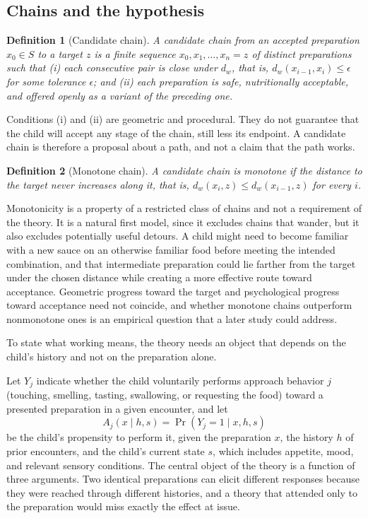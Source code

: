 \documentclass[11pt]{article}
\newtheorem{definition}{Definition}
\theoremstyle{remark}
\begin{document}
\subsection{Chains and the hypothesis}

\begin{definition}[Candidate chain]
A candidate chain from an accepted preparation $x_0 \in S$ to a target $z$ is a finite sequence $x_0, x_1, \ldots, x_n = z$ of distinct preparations such that (i) each consecutive pair is close under $d_w$, that is, $d_w(x_{i-1}, x_i) \leq \epsilon$ for some tolerance $\epsilon$; and (ii) each preparation is safe, nutritionally acceptable, and offered openly as a variant of the preceding one.
\end{definition}

Conditions (i) and (ii) are geometric and procedural. They do not guarantee that the child will accept any stage of the chain, still less its endpoint. A candidate chain is therefore a proposal about a path, and not a claim that the path works.

\begin{definition}[Monotone chain]
A candidate chain is monotone if the distance to the target never increases along it, that is, $d_w(x_i, z) \leq d_w(x_{i-1}, z)$ for every $i$.
\end{definition}

Monotonicity is a property of a restricted class of chains and not a requirement of the theory. It is a natural first model, since it excludes chains that wander, but it also excludes potentially useful detours. A child might need to become familiar with a new sauce on an otherwise familiar food before meeting the intended combination, and that intermediate preparation could lie farther from the target under the chosen distance while creating a more effective route toward acceptance. Geometric progress toward the target and psychological progress toward acceptance need not coincide, and whether monotone chains outperform nonmonotone ones is an empirical question that a later study could address.

To state what working means, the theory needs an object that depends on the child's history and not on the preparation alone.

Let $Y_j$ indicate whether the child voluntarily performs approach behavior $j$ (touching, smelling, tasting, swallowing, or requesting the food) toward a presented preparation in a given encounter, and let
\begin{equation}
A_j(x \mid h, s) = \Pr(Y_j = 1 \mid x, h, s)
\end{equation}
be the child's propensity to perform it, given the preparation $x$, the history $h$ of prior encounters, and the child's current state $s$, which includes appetite, mood, and relevant sensory conditions. The central object of the theory is a function of three arguments. Two identical preparations can elicit different responses because they were reached through different histories, and a theory that attended only to the preparation would miss exactly the effect at issue.
\end{document}

